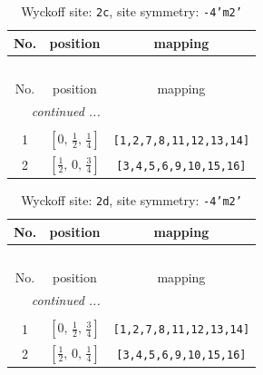 \documentclass[fleqn,8pt]{jsarticle}
\begin{document}
\renewcommand{\arraystretch}{1.2}
\begin{longtable}{ccc}
\caption{Wyckoff site: {\tt 2c}, site symmetry: {\tt -4'm2'}}
 \\
 \hline \hline
No. & position & mapping \\ \hline \endfirsthead

\multicolumn{2}{l}{\tablename\ \thetable{}} \\
 \hline \hline
No. & position & mapping \\ \hline \endhead

 \hline \hline
\multicolumn{2}{r}{\footnotesize\it continued ...} \\ \endfoot

 \hline \hline
\multicolumn{2}{r}{} \\ \endlastfoot

1 & $\left[ 0,\, \frac{1}{2},\, \frac{1}{4} \right]$ & {\tt [1,2,7,8,11,12,13,14]} \\ \hline
2 & $\left[ \frac{1}{2},\, 0,\, \frac{3}{4} \right]$ & {\tt [3,4,5,6,9,10,15,16]} \\
\end{longtable}
\renewcommand{\arraystretch}{1.2}
\begin{longtable}{ccc}
\caption{Wyckoff site: {\tt 2d}, site symmetry: {\tt -4'm2'}}
 \\
 \hline \hline
No. & position & mapping \\ \hline \endfirsthead

\multicolumn{2}{l}{\tablename\ \thetable{}} \\
 \hline \hline
No. & position & mapping \\ \hline \endhead

 \hline \hline
\multicolumn{2}{r}{\footnotesize\it continued ...} \\ \endfoot

 \hline \hline
\multicolumn{2}{r}{} \\ \endlastfoot

1 & $\left[ 0,\, \frac{1}{2},\, \frac{3}{4} \right]$ & {\tt [1,2,7,8,11,12,13,14]} \\ \hline
2 & $\left[ \frac{1}{2},\, 0,\, \frac{1}{4} \right]$ & {\tt [3,4,5,6,9,10,15,16]} \\
\end{longtable}
\renewcommand{\arraystretch}{1.2}
\end{document}
